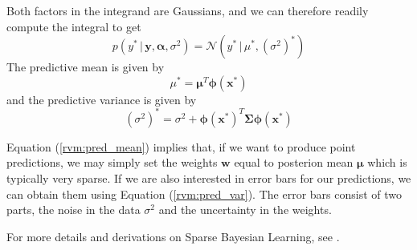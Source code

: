 Both factors in the integrand are Gaussians, and we can therefore readily compute the integral to get
\begin{equation}
  p(y^*\,|\,\bm y, \bm\alpha,\sigma^2) = \mathcal{N}(y^*\,|\,\mu^*,(\sigma^2)^*)
\end{equation}
The predictive mean is given by
\begin{equation}
  \label{rvm:pred_mean}
  \mu^* = \bm\mu^T\bm\phi(\bm x^*)
\end{equation}
and the predictive variance is given by
\begin{equation}
  \label{rvm:pred_var}
  (\sigma^2)^* = \sigma^2 + \bm\phi(\bm x^*)^T\bm\Sigma\bm\phi(\bm x^*)
\end{equation}

Equation (\ref{rvm:pred_mean}) implies that, if we want to produce point predictions, we may simply set the weights $\bm w$ equal to posterion mean $\bm\mu$ which is typically very sparse.
If we are also interested in error bars for our predictions, we can obtain them using Equation (\ref{rvm:pred_var}).
The error bars consist of two parts, the noise in the data $\sigma^2$ and the uncertainty in the weights.

For more details and derivations on Sparse Bayesian Learning, see \cite{tipping2001,tipping2002,tipping2003}.

